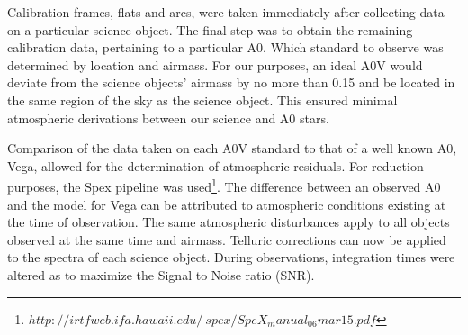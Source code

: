 Calibration frames, flats and arcs, were taken immediately after collecting data on a particular science object.  The final step was to obtain the remaining calibration data, pertaining to a particular A0.  Which standard to observe was determined by location and airmass.  For our purposes, an ideal A0V would deviate from the science objects' airmass by no more than 0.15 and be located in the same region of the sky as the science object.  This ensured minimal atmospheric derivations between our science and A0 stars.



Comparison of the data taken on each A0V standard to that of a well known A0, Vega, allowed for the determination of atmospheric residuals.  %
For reduction purposes, the Spex pipeline was used\footnote{$http://irtfweb.ifa.hawaii.edu/~spex/SpeX_manual_06mar15.pdf$}.  The difference between an observed A0 and the model for Vega can be attributed to atmospheric conditions existing at the time of observation.  The same atmospheric disturbances apply to all objects observed at the same time and airmass.  Telluric corrections can now be applied to the spectra of each science object.  During observations, integration times were altered as to maximize the Signal to Noise ratio (SNR). \cite{Cushing_2004}\\